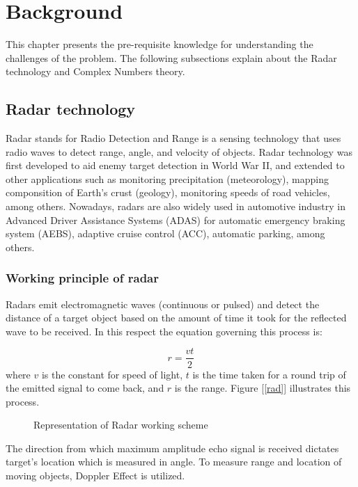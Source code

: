 \chapter{Background}\label{chap:comp}

This chapter presents the pre-requisite knowledge for understanding the challenges of the problem. The following subsections explain about the Radar technology and Complex Numbers theory.

\section{Radar technology}
Radar stands for Radio Detection and Range is a sensing technology that uses radio waves to detect range, angle, and velocity of objects. Radar technology was first developed to aid enemy target detection in World War II, and extended to other applications such as monitoring precipitation (meteorology), mapping componsition of Earth's crust (geology), monitoring speeds of road vehicles, among others. Nowadays, radars are also widely used in automotive industry in Advanced Driver Assistance Systems (ADAS) for automatic emergency braking system (AEBS), adaptive cruise control (ACC), automatic parking, among others.

\subsection{Working principle of radar}
Radars emit electromagnetic waves (continuous or pulsed) and detect the distance of a target object based on the amount of time it took for the reflected wave to be received.  In this respect the equation governing this process is:

\begin{equation}\label{dist}
r = \frac{vt}{2} 
\end{equation}
where $v$ is the constant for speed of light, $t$ is the time taken for a round trip of the emitted signal to come back, and $r$ is the range. Figure \ref{[rad]} illustrates this process.

\begin{figure}[htb]
	\centering
	\epsfxsize=5cm
	{}
	\caption{Representation of Radar working scheme}
	\label{fig:rad}
\end{figure}

The direction from which maximum amplitude echo signal is received dictates target’s location which is measured in angle. To measure range and location of moving objects, Doppler Effect is utilized.




